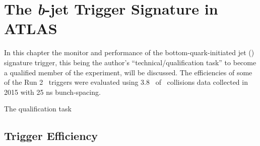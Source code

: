 \chapter{The \emph{b}-jet Trigger Signature in ATLAS}
\label{ch:trigger}

	In this chapter the monitor and performance of the bottom-quark-initiated jet (\bj) signature trigger, this being the author’s ``technical/qualification task'' to become a qualified member of the experiment, will be discussed. The efficiencies of some of the Run 2 \bj\ triggers were evaluated using 3.8 \ifb\ of \pp\ collisions data collected in 2015 with 25 ns bunch-spacing.

	The qualification task
	
	\section{Trigger Efficiency}